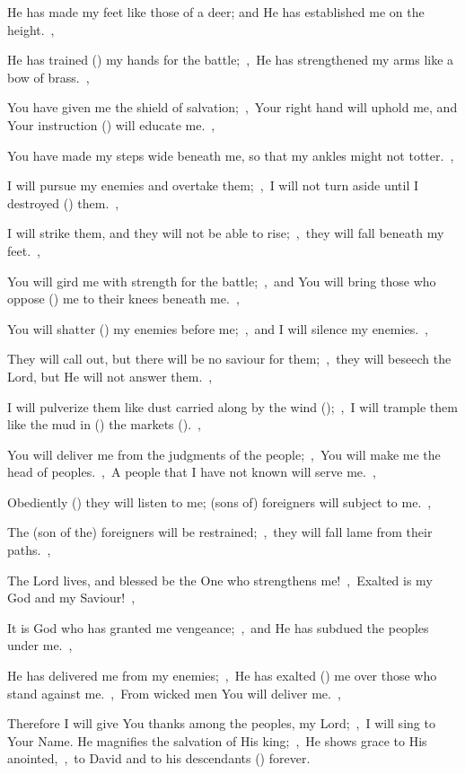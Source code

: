 \documentclass[12pt,twoside,a5paper]{article}
\begin{document}
\begin{normalparskip}
  He has made my feet like those of a deer; and He has established me on the height.~\sep

  He has trained () my hands for the battle;~\sep\ He has strengthened my arms like a bow of brass.~\sep

  You have given me the shield of salvation;~\sep\ Your right hand will uphold me, and Your instruction () will educate me.~\sep

  You have made my steps wide beneath me, so that my ankles might not totter.~\sep

  I will pursue my enemies and overtake them;~\sep\ I will not turn aside until I destroyed () them.~\sep

  I will strike them, and they will not be able to rise;~\sep\ they will fall beneath my feet.~\sep

  You will gird me with strength for the battle;~\sep\ and You will bring those who oppose () me to their knees beneath me.~\sep

  You will shatter () my enemies before me;~\sep\ and I will silence my enemies.~\sep

  They will call out, but there will be no saviour for them;~\sep\ they will beseech the Lord, but He will not answer them.~\sep

  I will pulverize them like dust carried along by the wind ();~\sep\ I will trample them like the mud in () the markets ().~\sep

  You will deliver me from the judgments of the people;~\sep\ You will make me the head of peoples.~\sep\ A people that I have not known will serve me.~\sep

  Obediently () they will listen to me; (sons of) foreigners will subject to me.~\sep

  The (son of the) foreigners will be restrained;~\sep\ they will fall lame from their paths.~\sep

  The Lord lives, and blessed be the One who strengthens me!~\sep\ Exalted is my God and my Saviour!~\sep

  It is God who has granted me vengeance;~\sep\ and He has subdued the peoples under me.~\sep

  He has delivered me from my enemies;~\sep\ He has exalted () me over those who stand against me.~\sep\ From wicked men You will deliver me.~\sep

  Therefore I will give You thanks among the peoples, my Lord;~\sep\ I will sing to Your Name. He magnifies the salvation of His king;~\sep\ He shows grace to His anointed,~\sep\ to David and to his descendants () forever.
\end{normalparskip}
\end{document}
